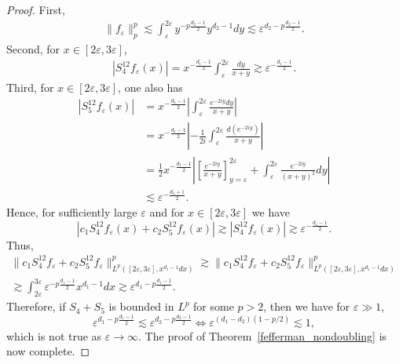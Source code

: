 \documentclass[10pt,a4paper]{amsart}
\begin{document}
\begin{proof}
First,
\begin{align*}
    \| f_\varepsilon \|_p^p \lesssim \int_\varepsilon^{2\varepsilon} y^{-p \frac{d_2-1}{2}} y^{d_2-1} dy \lesssim \varepsilon^{d_2 - p \frac{d_2-1}{2}}.
\end{align*}
Second, for $x\in [2\varepsilon,3\varepsilon]$,
\begin{align*}
    |S_4^{12}f_{\varepsilon}(x)| = x^{-\frac{d_1-1}{2}} \int_\varepsilon^{2\varepsilon} \frac{dy}{x+y} \gtrsim \varepsilon^{-\frac{d_1-1}{2}}.
\end{align*}
Third, for $x\in [2\varepsilon,3\varepsilon]$, one also has
\begin{align*}
    |S_5^{12} f_\varepsilon(x)| &= x^{-\frac{d_1-1}{2}} \left| \int_\varepsilon^{2\varepsilon} \frac{e^{-2iy}dy}{x+y} \right| \\
    &= x^{-\frac{d_1-1}{2}} \left| -\frac{1}{2i} \int_\varepsilon^{2\varepsilon} \frac{d (e^{-2iy}) }{x+y} \right|\\
    &= \frac{1}{2} x^{-\frac{d_1-1}{2}} \left| \left[\frac{e^{-2iy}}{x+y}\right]_{y=\varepsilon}^{2\varepsilon} +   \int_\varepsilon^{2\varepsilon} \frac{e^{-2iy}}{(x+y)^2} dy  \right|\\
    &\lesssim \varepsilon^{-\frac{d_1+1}{2}}.
\end{align*} 
Hence, for sufficiently large $\varepsilon$ and  for $x\in [2\varepsilon,3\varepsilon]$ we have 
\begin{equation*}
    |c_1 S_4^{12}f_\varepsilon(x) + c_2 S_5^{12}f_\varepsilon(x)| \gtrsim |S_4^{12}f_\varepsilon(x)| \gtrsim \varepsilon^{-\frac{d_1-1}{2}}.
\end{equation*}
Thus,
\begin{align*}
 \| c_1 S_4^{12} f_\varepsilon + c_2S_5^{12} f_\varepsilon\|_{L^p([2\varepsilon,3\varepsilon], x^{d_1-1} dx)}^p \gtrsim \| c_1 S_4^{12} f_\varepsilon + c_2 S_5^{12} f_\varepsilon \|_{L^p([2\varepsilon,3\varepsilon], x^{d_1-1}dx)}^p \\ \gtrsim \int_{2\varepsilon}^{3\varepsilon} \varepsilon^{-p \frac{d_1-1}{2}} x^{d_1-1} dx \gtrsim \varepsilon^{d_1-p\frac{d_1-1}{2}}.
\end{align*}
Therefore, if $S_4+S_5$ is bounded in $L^p$ for some $p>2$, then we have for $\varepsilon  \gg 1$,
\begin{equation*}
    \varepsilon^{d_1-p\frac{d_1-1}{2}} \lesssim \varepsilon^{d_2 - p \frac{d_2-1}{2}} \iff \varepsilon^{(d_1-d_2)(1-p/2)} \lesssim 1,
\end{equation*}
which is not true as $\varepsilon\to \infty$. The proof of Theorem~\ref{fefferman_nondoubling} is now complete.
\end{proof}
\end{document}
